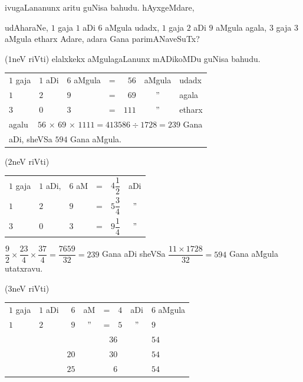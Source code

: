ivugaLananunx aritu guNisa bahudu. hAyxgeMdare,

udAharaNe, $1$ gaja $1$ aDi $6$ aMgula udadx, $1$ gaja $2$ aDi $9$
aMgula agala, $3$ gaja $3$ aMgula etharx Adare, adara Gana
parimANaveSuTx?

($1$neV riVti) elalxkekx aMgulagaLanunx mADikoMDu guNisa bahudu.
\begin{center}
\begin{tabular}{lllcrcl}
$1$ gaja & $1$ aDi & $6$ aMgula & = & $56$ & aMgula & udadx\\
$1$ & $2$ & $9$ & = & $69$ & '' & agala\\
$3$ & $0$ & $3$ & = & $111$ & '' & etharx\\[5pt]
\multicolumn{7}{l}{agalu~~\,$56\,\times\, 69\,\times\, 1111=413586\div
  1728=239$ Gana}\\
\multicolumn{7}{l}{\quad aDi, sheVSa $594$ Gana aMgula.}
\end{tabular}
\end{center}

\medskip

($2$neV riVti)
\begin{center}
\begin{tabular}{lllccc}
$1$ gaja & $1$ aDi, & $6$ aM & = & $4\dfrac{1}{2}$ & aDi\\[10pt]
$1$ & $2$ & $9$ & = & $5\dfrac{3}{4}$ & ''\\[10pt]
$3$ & $0$ & $3$ & = & $9\dfrac{1}{4}$ & ''
\end{tabular}
\end{center}
$\dfrac{9}{2}\times\dfrac{23}{4}\times
\dfrac{37}{4}=\dfrac{7659}{32}=239$ Gana aDi sheVSa $\dfrac{11\times
  1728}{32}=594$ Gana aMgula utatxravu. 

\medskip

($3$neV riVti)
\begin{center}
\begin{tabular}{llrccccl}
$1$ gaja & $1$ aDi & $6$ & aM & = & $4$ & aDi & $6$ aMgula\\
$1$ & $2$ & $9$ & '' & = & $5$ & '' & $9$\\
\cline{4-7}
 & & & \multicolumn{4}{c}{$36$} & $54$\\
 & & $20$ & \multicolumn{4}{c}{$30$} & $54$\\
\cline{4-7}
 & & $25$ & \multicolumn{4}{c}{~$6$} & $54$
\end{tabular}
\end{center}

